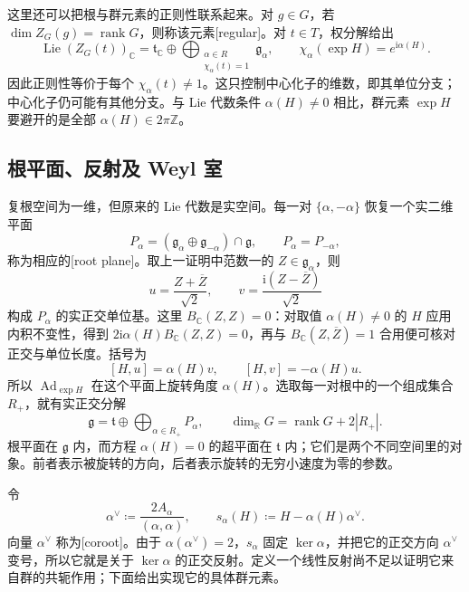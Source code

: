 这里还可以把根与群元素的正则性联系起来。对 \(g\in G\)，若 \(\dim Z_G(g)=\operatorname{rank}G\)，则称该元素[regular]。对 \(t\in T\)，权分解给出
\[
	\operatorname{Lie}(Z_G(t))_{\mathbb C}
	=\mathfrak t_{\mathbb C}\oplus
	\bigoplus_{\substack{\alpha\in R\\\chi_\alpha(t)=1}}\mathfrak g_\alpha,
	\qquad \chi_\alpha(\exp H)=e^{\mathrm{i}\alpha(H)}.
\]
因此正则性等价于每个 \(\chi_\alpha(t)\ne1\)。这只控制中心化子的维数，即其单位分支；中心化子仍可能有其他分支。与 Lie 代数条件 \(\alpha(H)\ne0\) 相比，群元素 \(\exp H\) 要避开的是全部 \(\alpha(H)\in2\pi\mathbb Z\)。

\subsection{根平面、反射及 Weyl 室}
\label{g1:subsec:1904:03}
复根空间为一维，但原来的 Lie 代数是实空间。每一对 \(\{\alpha,-\alpha\}\) 恢复一个实二维平面
\[
	P_\alpha=(\mathfrak g_\alpha\oplus\mathfrak g_{-\alpha})\cap\mathfrak g,
	\qquad P_\alpha=P_{-\alpha},
\]
称为相应的[root plane]。取上一证明中范数一的 \(Z\in\mathfrak g_\alpha\)，则
\[
	u=\frac{Z+\overline Z}{\sqrt2},\qquad
	v=\frac{\mathrm{i}(Z-\overline Z)}{\sqrt2}
\]
构成 \(P_\alpha\) 的实正交单位基。这里 \(B_{\mathbb C}(Z,Z)=0\)：对取值 \(\alpha(H)\ne0\) 的 \(H\) 应用内积不变性，得到 \(2\mathrm{i}\alpha(H)B_{\mathbb C}(Z,Z)=0\)，再与 \(B_{\mathbb C}(Z,\overline Z)=1\) 合用便可核对正交与单位长度。括号为
\[
	[H,u]=\alpha(H)v,\qquad [H,v]=-\alpha(H)u.
\]
所以 \(\operatorname{Ad}_{\exp H}\) 在这个平面上旋转角度 \(\alpha(H)\)。选取每一对根中的一个组成集合 \(R_+\)，就有实正交分解
\[
	\mathfrak g=\mathfrak t\oplus\bigoplus_{\alpha\in R_+}P_\alpha,
	\qquad \dim_{\mathbb R}G=\operatorname{rank}G+2|R_+|.
\]
根平面在 \(\mathfrak g\) 内，而方程 \(\alpha(H)=0\) 的超平面在 \(\mathfrak t\) 内；它们是两个不同空间里的对象。前者表示被旋转的方向，后者表示旋转的无穷小速度为零的参数。

\ProseParagraphBreak
令
\begin{equation}\label{g1:eq:coroot-reflection}
	\alpha^\vee\coloneqq\frac{2A_\alpha}{(\alpha,\alpha)},
	\qquad
	s_\alpha(H)\coloneqq H-\alpha(H)\alpha^\vee.
\end{equation}
向量 \(\alpha^\vee\) 称为[coroot]。由于 \(\alpha(\alpha^\vee)=2\)，\(s_\alpha\) 固定 \(\ker\alpha\)，并把它的正交方向 \(\alpha^\vee\) 变号，所以它就是关于 \(\ker\alpha\) 的正交反射。定义一个线性反射尚不足以证明它来自群的共轭作用；下面给出实现它的具体群元素。

